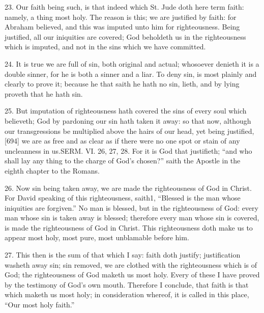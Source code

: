 23. Our faith being such, is that indeed which St. Jude doth here term faith: namely, a thing most holy. The reason is this; we are justified by faith: for Abraham believed, and this was imputed unto him for righteousness. Being justified, all our iniquities are covered; God beholdeth us in the righteousness which is imputed, and not in the sins which we have committed.

24. It is true we are full of sin, both original and actual; whosoever denieth it is a double sinner, for he is both a sinner and a liar. To deny sin, is most plainly and clearly to prove it; because he that saith he hath no sin, lieth, and by lying proveth that he hath sin.

25. But imputation of righteousness hath covered the sins of every soul which believeth; God by pardoning our sin hath taken it away: so that now, although our transgressions be multiplied above the hairs of our head, yet being justified, [694] we are as free and as clear as if there were no one spot or stain of any uncleanness in us.SERM. VI. 26, 27, 28. For it is God that justifieth; “and who shall lay any thing to the charge of God’s chosen?” saith the Apostle in the eighth chapter to the Romans.

26. Now sin being taken away, we are made the righteousness of God in Christ. For David speaking of this righteousness, saith1, “Blessed is the man whose iniquities are forgiven.” No man is blessed, but in the righteousness of God: every man whose sin is taken away is blessed; therefore every man whose sin is covered, is made the righteousness of God in Christ. This righteousness doth make us to appear most holy, most pure, most unblamable before him.

27. This then is the sum of that which I say: faith doth justify; justification washeth away sin; sin removed, we are clothed with the righteousness which is of God; the righteousness of God maketh us most holy. Every of these I have proved by the testimony of God’s own mouth. Therefore I conclude, that faith is that which maketh us most holy; in consideration whereof, it is called in this place, “Our most holy faith.”

